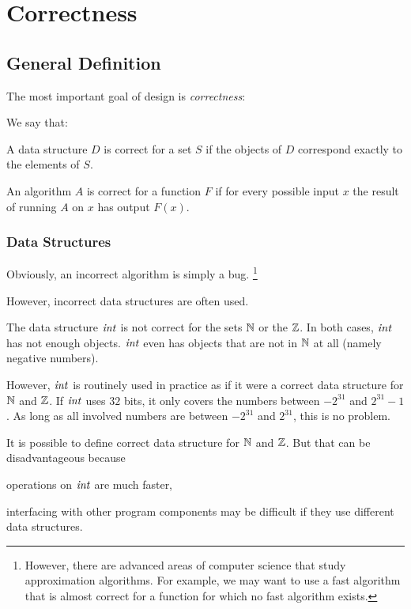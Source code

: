 \section{Correctness}

\subsection{General Definition}

The most important goal of design is \emph{correctness}:

\begin{definition}\label{def:ad:correct}
We say that:
\begin{compactitem}
 \item A data structure $D$ is correct for a set $S$ if the objects of $D$ correspond exactly to the elements of $S$.
 \item An algorithm $A$ is correct for a function $F$ if for every possible input $x$ the result of running $A$ on $x$ has output $F(x)$.
\end{compactitem}
\end{definition}

\subsubsection{Data Structures}

Obviously, an incorrect algorithm is simply a bug.%
\footnote{However, there are advanced areas of computer science that study approximation algorithms.
For example, we may want to use a fast algorithm that is almost correct for a function for which no fast algorithm exists.}

However, incorrect data structures are often used.

\begin{example}
The data structure $\mathit{int}$ is not correct for the sets $\mathbb{N}$ or the $\mathbb{Z}$.
In both cases, $\mathit{int}$ has not enough objects.
$\mathit{int}$ even has objects that are not in $\mathbb{N}$ at all (namely negative numbers).

However, $\mathit{int}$ is routinely used in practice as if it were a correct data structure for $\mathbb{N}$ and $\mathbb{Z}$.
If $\mathit{int}$ uses $32$ bits, it only covers the numbers between $-2^{31}$ and $2^{31}-1$.
As long as all involved numbers are between $-2^{31}$ and $2^{31}$, this is no problem.

It is possible to define correct data structure for $\mathbb{N}$ and $\mathbb{Z}$.
But that can be disadvantageous because
\begin{compactitem}
\item operations on $\mathit{int}$ are much faster,
\item interfacing with other program components may be difficult if they use different data structures.
\end{compactitem}
\end{example}

